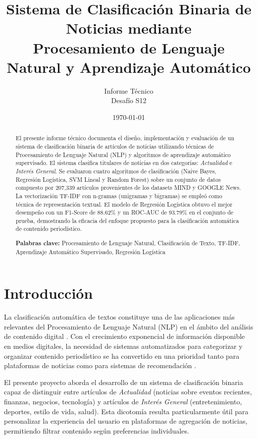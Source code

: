 \documentclass[12pt,a4paper]{article}
\title{\textbf{Sistema de Clasificación Binaria de Noticias mediante\\Procesamiento de Lenguaje Natural y Aprendizaje Automático}}
\author{Informe Técnico\\Desafío S12}
\date{\today}
\begin{document}
\maketitle

\begin{abstract}
\noindent El presente informe técnico documenta el diseño, implementación y evaluación de un sistema de clasificación binaria de artículos de noticias utilizando técnicas de Procesamiento de Lenguaje Natural (NLP) y algoritmos de aprendizaje automático supervisado. El sistema clasifica titulares de noticias en dos categorías: \textit{Actualidad} e \textit{Interés General}. Se evaluaron cuatro algoritmos de clasificación (Naive Bayes, Regresión Logística, SVM Lineal y Random Forest) sobre un conjunto de datos compuesto por 207,339 artículos provenientes de los datasets MIND y GOOGLE News. La vectorización TF-IDF con n-gramas (unigramas y bigramas) se empleó como técnica de representación textual. El modelo de Regresión Logística obtuvo el mejor desempeño con un F1-Score de 88.62\% y un ROC-AUC de 93.79\% en el conjunto de prueba, demostrando la eficacia del enfoque propuesto para la clasificación automática de contenido periodístico.

\vspace{0.5em}
\noindent\textbf{Palabras clave:} Procesamiento de Lenguaje Natural, Clasificación de Texto, TF-IDF, Aprendizaje Automático Supervisado, Regresión Logística
\end{abstract}

\section{Introducción}

La clasificación automática de textos constituye una de las aplicaciones más relevantes del Procesamiento de Lenguaje Natural (NLP) en el ámbito del análisis de contenido digital \cite{aggarwal2012}. Con el crecimiento exponencial de información disponible en medios digitales, la necesidad de sistemas automatizados para categorizar y organizar contenido periodístico se ha convertido en una prioridad tanto para plataformas de noticias como para sistemas de recomendación \cite{wu2019}.

El presente proyecto aborda el desarrollo de un sistema de clasificación binaria capaz de distinguir entre artículos de \textit{Actualidad} (noticias sobre eventos recientes, finanzas, negocios, tecnología) y artículos de \textit{Interés General} (entretenimiento, deportes, estilo de vida, salud). Esta dicotomía resulta particularmente útil para personalizar la experiencia del usuario en plataformas de agregación de noticias, permitiendo filtrar contenido según preferencias individuales.
\end{document}
